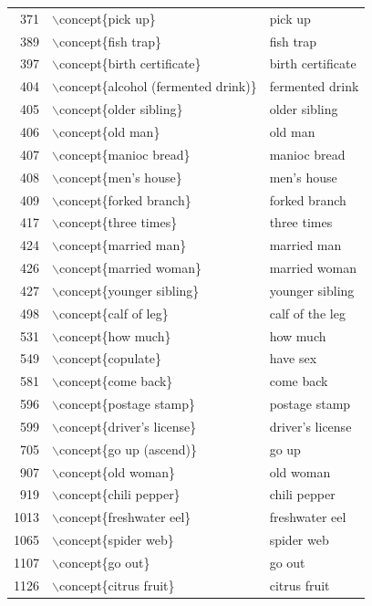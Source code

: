 \begin{table}[ht]
\begin{tabular}{rll}
  371 & $\backslash$concept\{pick up\} & pick up \\ 
  389 & $\backslash$concept\{fish trap\} & fish trap \\ 
  397 & $\backslash$concept\{birth certificate\} & birth certificate \\ 
  404 & $\backslash$concept\{alcohol (fermented drink)\} & fermented drink \\ 
  405 & $\backslash$concept\{older sibling\} & older sibling \\ 
  406 & $\backslash$concept\{old man\} & old man \\ 
  407 & $\backslash$concept\{manioc bread\} & manioc bread \\ 
  408 & $\backslash$concept\{men's house\} & men's house \\ 
  409 & $\backslash$concept\{forked branch\} & forked branch \\ 
  417 & $\backslash$concept\{three times\} & three times \\ 
  424 & $\backslash$concept\{married man\} & married man \\ 
  426 & $\backslash$concept\{married woman\} & married woman \\ 
  427 & $\backslash$concept\{younger sibling\} & younger sibling \\ 
  498 & $\backslash$concept\{calf of leg\} & calf of the leg \\ 
  531 & $\backslash$concept\{how much\} & how much \\ 
  549 & $\backslash$concept\{copulate\} & have sex \\ 
  581 & $\backslash$concept\{come back\} & come back \\ 
  596 & $\backslash$concept\{postage stamp\} & postage stamp \\ 
  599 & $\backslash$concept\{driver's license\} & driver's license \\ 
  705 & $\backslash$concept\{go up (ascend)\} & go up \\ 
  907 & $\backslash$concept\{old woman\} & old woman \\ 
  919 & $\backslash$concept\{chili pepper\} & chili pepper \\ 
  1013 & $\backslash$concept\{freshwater eel\} & freshwater eel \\ 
  1065 & $\backslash$concept\{spider web\} & spider web \\ 
  1107 & $\backslash$concept\{go out\} & go out \\ 
  1126 & $\backslash$concept\{citrus fruit\} & citrus fruit \\ 

\end{tabular}
\end{table}
